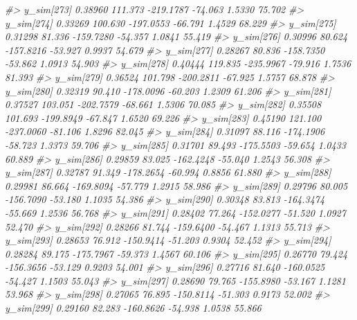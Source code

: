 \documentclass[
  10pt,
  italian,
  a4paper,
  extrafontsizes,onecolumn,openright
  ]{memoir}
\newenvironment{Shaded}{\begin{snugshade}}{\end{snugshade}}
\newcommand{\CommentTok}[1]{\textcolor[rgb]{0.56,0.35,0.01}{\textit{#1}}}
\begin{document}
\begin{Shaded}
\begin{Highlighting}[]
\CommentTok{\#\textgreater{}   y\_sim[273]  0.38960 111.373 {-}219.1787 {-}74.063  1.5330 75.702}
\CommentTok{\#\textgreater{}   y\_sim[274]  0.33269 100.630 {-}197.0553 {-}66.791  1.4529 68.229}
\CommentTok{\#\textgreater{}   y\_sim[275]  0.31298  81.336 {-}159.7280 {-}54.357  1.0841 55.419}
\CommentTok{\#\textgreater{}   y\_sim[276]  0.30996  80.624 {-}157.8216 {-}53.927  0.9937 54.679}
\CommentTok{\#\textgreater{}   y\_sim[277]  0.28267  80.836 {-}158.7350 {-}53.862  1.0913 54.903}
\CommentTok{\#\textgreater{}   y\_sim[278]  0.40444 119.835 {-}235.9967 {-}79.916  1.7536 81.393}
\CommentTok{\#\textgreater{}   y\_sim[279]  0.36524 101.798 {-}200.2811 {-}67.925  1.5757 68.878}
\CommentTok{\#\textgreater{}   y\_sim[280]  0.32319  90.410 {-}178.0096 {-}60.203  1.2309 61.206}
\CommentTok{\#\textgreater{}   y\_sim[281]  0.37527 103.051 {-}202.7579 {-}68.661  1.5306 70.085}
\CommentTok{\#\textgreater{}   y\_sim[282]  0.35508 101.693 {-}199.8949 {-}67.847  1.6520 69.226}
\CommentTok{\#\textgreater{}   y\_sim[283]  0.45190 121.100 {-}237.0060 {-}81.106  1.8296 82.045}
\CommentTok{\#\textgreater{}   y\_sim[284]  0.31097  88.116 {-}174.1906 {-}58.723  1.3373 59.706}
\CommentTok{\#\textgreater{}   y\_sim[285]  0.31701  89.493 {-}175.5503 {-}59.654  1.0433 60.889}
\CommentTok{\#\textgreater{}   y\_sim[286]  0.29859  83.025 {-}162.4248 {-}55.040  1.2543 56.308}
\CommentTok{\#\textgreater{}   y\_sim[287]  0.32787  91.349 {-}178.2654 {-}60.994  0.8856 61.880}
\CommentTok{\#\textgreater{}   y\_sim[288]  0.29981  86.664 {-}169.8094 {-}57.779  1.2915 58.986}
\CommentTok{\#\textgreater{}   y\_sim[289]  0.29796  80.005 {-}156.7090 {-}53.180  1.1035 54.386}
\CommentTok{\#\textgreater{}   y\_sim[290]  0.30348  83.813 {-}164.3474 {-}55.669  1.2536 56.768}
\CommentTok{\#\textgreater{}   y\_sim[291]  0.28402  77.264 {-}152.0277 {-}51.520  1.0927 52.470}
\CommentTok{\#\textgreater{}   y\_sim[292]  0.28266  81.744 {-}159.6400 {-}54.467  1.1313 55.713}
\CommentTok{\#\textgreater{}   y\_sim[293]  0.28653  76.912 {-}150.9414 {-}51.203  0.9304 52.452}
\CommentTok{\#\textgreater{}   y\_sim[294]  0.28284  89.175 {-}175.7967 {-}59.373  1.4567 60.106}
\CommentTok{\#\textgreater{}   y\_sim[295]  0.26770  79.424 {-}156.3656 {-}53.129  0.9203 54.001}
\CommentTok{\#\textgreater{}   y\_sim[296]  0.27716  81.640 {-}160.0525 {-}54.427  1.1503 55.043}
\CommentTok{\#\textgreater{}   y\_sim[297]  0.28690  79.765 {-}155.8980 {-}53.167  1.1281 53.968}
\CommentTok{\#\textgreater{}   y\_sim[298]  0.27065  76.895 {-}150.8114 {-}51.303  0.9173 52.002}
\CommentTok{\#\textgreater{}   y\_sim[299]  0.29160  82.283 {-}160.8626 {-}54.938  1.0538 55.866}

\end{Highlighting}
\end{Shaded}
\end{document}
